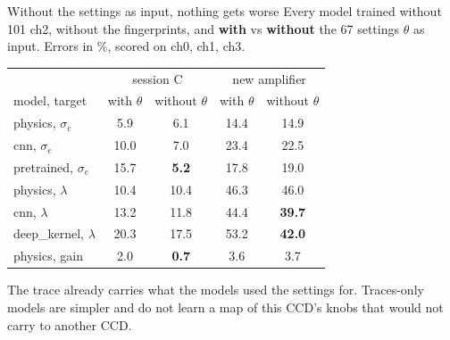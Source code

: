 \begin{frame}{Without the settings as input, nothing gets worse}
\small Every model trained without 101 ch2, without the fingerprints, and \textbf{with} vs \textbf{without} the 67 settings $\theta$ as input. Errors in \%, scored on ch0, ch1, ch3.\par\medskip
\begin{tabular}{lcccc}\toprule
 & \multicolumn{2}{c}{session C} & \multicolumn{2}{c}{new amplifier}\\
model, target & with $\theta$ & without $\theta$ & with $\theta$ & without $\theta$\\\midrule
physics, $\sigma_e$ & 5.9 & 6.1 & 14.4 & 14.9\\
cnn, $\sigma_e$ & 10.0 & 7.0 & 23.4 & 22.5\\
pretrained, $\sigma_e$ & 15.7 & \textbf{5.2} & 17.8 & 19.0\\
physics, $\lambda$ & 10.4 & 10.4 & 46.3 & 46.0\\
cnn, $\lambda$ & 13.2 & 11.8 & 44.4 & \textbf{39.7}\\
deep\_kernel, $\lambda$ & 20.3 & 17.5 & 53.2 & \textbf{42.0}\\
physics, gain & 2.0 & \textbf{0.7} & 3.6 & 3.7\\\bottomrule
\end{tabular}\par\medskip
The trace already carries what the models used the settings for. Traces-only models are simpler and do not learn a map of this CCD's knobs that would not carry to another CCD.
\end{frame}
